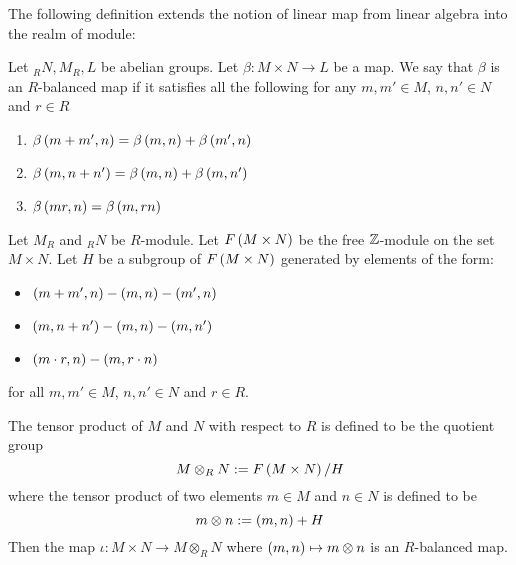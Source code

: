 The following definition extends the notion of linear map from linear algebra into the realm of module:
\begin{defn} 
    Let $_RN, M_R, L$ be abelian groups. Let $\beta:M\times N\to L$ be a map. We say that $\beta$ is an $R$-balanced map if it satisfies all the following for any $m, m'\in M$, $n, n'\in N$ and $r\in R$
    \begin{enumerate}
        \item $\beta\left(m+m',n\right)=\beta \left(m,n\right)+ \beta \left(m',n\right)$
        \item $\beta \left(m,n+n'\right) = \beta \left(m,n\right) + \beta \left(m,n'\right)$
        \item $\beta \left(mr,n\right) = \beta \left(m,rn\right)$
    \end{enumerate}
\end{defn}

\medskip

\begin{defn} 
    Let $M_R$ and $_RN$ be $R$-module. Let $F \left(M\times N\right)$ be the free ${\mathbb Z}$-module on the set $M\times N$. Let $H$ be a subgroup of $F \left(M\times N\right)$ generated by elements of the form:
    \begin{itemize}
        \item $\left(m+m', n\right)-\left(m,n\right)-\left(m', n\right)$
        \item $\left(m, n+n'\right)-\left(m,n\right)-\left(m, n'\right)$
        \item $\left(m\cdot r, n\right)-\left(m, r\cdot n\right)$
    \end{itemize}
    for all $m,m'\in M$, $n,n'\in N$ and $r\in R$.

    The tensor product of $M$ and $N$ with respect to $R$ is defined to be the quotient group
    \[M\otimes _R N:= F \left(M\times N\right)/H\]
    where the tensor product of two elements $m\in M$ and $n\in N$ is defined to be
    \[m\otimes n := \left(m,n\right)+H\]
    Then the map $\iota:M\times N \to M\otimes_R N$ where $\left(m,n\right)\mapsto m\otimes n$ is an $R$-balanced map.
\end{defn}

\medskip

